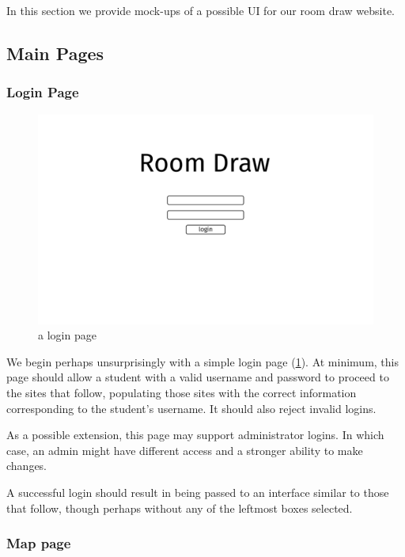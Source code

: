 In this section we provide mock-ups of a possible UI for our room draw website.

\subsection{Main Pages}
\subsubsection{Login Page}

\begin{figure}[H] \centering
\includegraphics[scale=.15]{wireframe/login}
\caption{a login page}
\label{fig:wirelogin}
\end{figure}

We begin perhaps unsurprisingly with a simple login page (\cref{fig:wirelogin}).
At minimum, this page should allow a student with a valid username and password
to proceed to the sites that follow, populating those sites with the correct
information corresponding to the student's username. It should also reject
invalid logins.

As a possible extension, this page may support administrator logins. In which
case, an admin might have different access and a stronger ability to make
changes.

A successful login should result in being passed to an interface similar to
those that follow, though perhaps without any of the leftmost boxes selected.

\subsubsection{Map page}


